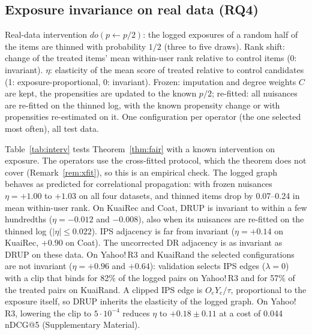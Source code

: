 \documentclass[preprint,review,12pt,authoryear]{elsarticle}
\theoremstyle{definition}
\begin{document}
\subsection{Exposure invariance on real data (RQ4)}\label{sec:fair}

\begin{table}[t]\centering\small
\caption{Real-data intervention $do(p\leftarrow p/2)$: the logged exposures of a
random half of the items are thinned with probability $1/2$ (three to five
draws). Rank shift: change of the treated items' mean within-user rank
relative to control items (0: invariant). $\eta$: elasticity of the mean score
of treated relative to control candidates (1: exposure-proportional, 0:
invariant). Frozen: imputation and degree weights $C$ are kept, the propensities
are updated to the known $p/2$; re-fitted: all nuisances are re-fitted on the thinned
log, with the known propensity change or with propensities re-estimated on it. One configuration
per operator (the one selected most often), all test data.}\label{tab:interv}
\begin{adjustbox}{max width=\textwidth}

\end{adjustbox}
\end{table}

Table~\ref{tab:interv} tests Theorem~\ref{thm:fair} with a known intervention on
exposure. The operators use the cross-fitted protocol, which the theorem does not
cover (Remark~\ref{rem:xfit}), so this is an empirical check. The logged graph
behaves as predicted for correlational propagation: with frozen nuisances
$\eta=+1.00$ to $+1.03$ on all four datasets, and thinned items drop by 0.07--0.24 in
mean within-user rank. On KuaiRec and Coat, DRUP is invariant to within a few
hundredths ($\eta=-0.012$ and $-0.008$), also when its nuisances are re-fitted on the
thinned log ($|\eta|\le0.022$). IPS adjacency is far from invariant ($\eta=+0.14$ on
KuaiRec, $+0.90$ on Coat). The uncorrected DR adjacency is as invariant as DRUP on
these data. On Yahoo!\,R3 and KuaiRand the selected configurations are not invariant
($\eta=+0.96$ and $+0.64$): validation selects IPS edges ($\lambda=0$) with a clip that
binds for 82\% of the logged pairs on Yahoo!\,R3 and for 57\% of the treated pairs on
KuaiRand. A clipped IPS edge is $O_eY_e/\tau$, proportional to the exposure itself, so
DRUP inherits the elasticity of the logged graph. On Yahoo!\,R3, lowering the clip to
$5\cdot10^{-4}$ reduces $\eta$ to $+0.18\pm0.11$ at a cost of 0.044 nDCG@5
(Supplementary Material).
\end{document}
